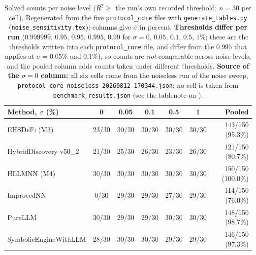 \documentclass[twoside,11pt]{article}
\newcommand{\EHD}{\textsc{EHSDeFi}}
\newcommand{\HSL}{\textsc{HLLMNN}}
\newcommand{\Rsq}{R^{2}}
\begin{document}
\begin{table}[H]
\centering
\caption{Solved counts per noise level ($\Rsq\geq$ the run's own recorded
  threshold; $n=30$ per cell). Regenerated from the five \texttt{protocol\_core}
  files with \texttt{generate\_tables.py} (\texttt{noise\_sensitivity.tex});
  columns give $\sigma$ in percent. \textbf{Thresholds differ per run}
  ($0.999999$, $0.95$, $0.95$, $0.995$, $0.99$ for $\sigma=0$, $0.05$,
  $0.1$, $0.5$, $1\%$; these are the thresholds written into each
  \texttt{protocol\_core} file, and differ from the $0.995$ that
   applies at $\sigma=0.05\%$ and $0.1\%$), so counts are \emph{not} comparable across noise
  levels, and the pooled column adds counts taken under different thresholds.
  \textbf{Source of the $\sigma=0$ column:} all six cells come from the noiseless run of the noise sweep, \texttt{protocol\_core\_noiseless\_20260812\_170344.json}; no cell is taken from \texttt{benchmark\_results.json} (see the tablenote on ).}
\label{tab:noise_sensitivity}
\small
\setlength{\tabcolsep}{4pt}
\begin{tabular}{@{}l c c c c c r@{}}
\toprule
\textbf{Method, $\sigma$ (\%)} & \textbf{0} & \textbf{0.05} & \textbf{0.1} & \textbf{0.5} & \textbf{1} & \textbf{Pooled}\\
\midrule
\EHD{} (M3)            & 23/30 & 30/30 & 30/30 & 30/30 & 30/30 & 143/150 (95.3\%)\\
HybridDiscovery v50\_2 & 21/30 & 25/30 & 26/30 & 23/30 & 26/30 & 121/150 (80.7\%)\\
\HSL{} (M4)            & 30/30 & 30/30 & 30/30 & 30/30 & 30/30 & 150/150 (100.0\%)\\
ImprovedNN             &  0/30 & 29/30 & 29/30 & 27/30 & 29/30 & 114/150 (76.0\%)\\
PureLLM                & 30/30 & 29/30 & 29/30 & 30/30 & 30/30 & 148/150 (98.7\%)\\
SymbolicEngineWithLLM  & 28/30 & 30/30 & 30/30 & 29/30 & 29/30 & 146/150 (97.3\%)\\
\bottomrule
\end{tabular}
\end{table}
\end{document}
